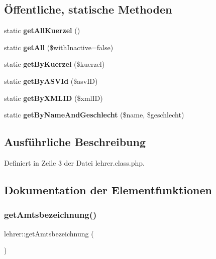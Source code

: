 \subsection*{Öffentliche, statische Methoden}
\begin{DoxyCompactItemize}
\item 
\mbox{\label{classlehrer_a393e37f3a40bcab6f0d5faa57f606f51}} 
static {\bfseries get\+All\+Kuerzel} ()
\item 
\mbox{\label{classlehrer_af3defc29bf72c0545b4c6dfdc99ddb40}} 
static {\bfseries get\+All} (\$with\+Inactive=false)
\item 
\mbox{\label{classlehrer_ad17622e50e35abb78a7b1a9640bbda91}} 
static {\bfseries get\+By\+Kuerzel} (\$kuerzel)
\item 
\mbox{\label{classlehrer_a514285a6eb656b5c0afc5db04752f561}} 
static {\bfseries get\+By\+A\+S\+V\+Id} (\$asv\+ID)
\item 
\mbox{\label{classlehrer_aefd4076708750db94f28751f262337da}} 
static {\bfseries get\+By\+X\+M\+L\+ID} (\$xml\+ID)
\item 
\mbox{\label{classlehrer_a1ad4709252474a27ce1268417ab5de43}} 
static {\bfseries get\+By\+Name\+And\+Geschlecht} (\$name, \$geschlecht)
\end{DoxyCompactItemize}


\subsection{Ausführliche Beschreibung}


Definiert in Zeile 3 der Datei lehrer.\+class.\+php.



\subsection{Dokumentation der Elementfunktionen}
\mbox{\label{classlehrer_a2c1fe9939bbab5ff9e1ae1ec72c6a01e}} 
\subsubsection{\texorpdfstring{get\+Amtsbezeichnung()}{getAmtsbezeichnung()}}
{\footnotesize\ttfamily lehrer\+::get\+Amtsbezeichnung (\begin{DoxyParamCaption}{ }\end{DoxyParamCaption})}


